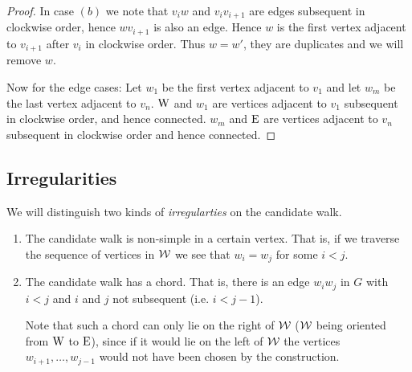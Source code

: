 \begin{proof}
In case $(b)$ we note that $v_i w$ and $v_i v_{i+1}$ are edges subsequent in clockwise order, hence $wv_{i+1}$ is also an edge. Hence $w$ is the first vertex adjacent to $v_{i+1}$ after $v_i$ in clockwise order. Thus $w= w'$, they are duplicates and we will remove $w$.

Now for the edge cases: Let $w_1$ be the first vertex adjacent to $v_1$ and let $w_m$ be the last vertex adjacent to $v_n$. $\mathrm{W}$ and $w_1$ are vertices adjacent to $v_1$ subsequent in clockwise order, and hence connected. $w_m$ and $\mathrm{E}$ are vertices adjacent to $v_n$ subsequent in clockwise order and hence connected. 
\end{proof}


\subsection{Irregularities}

We will distinguish two kinds of \emph{irregularties} on the candidate walk.
\begin{enumerate}
\item The candidate walk is non-simple in a certain vertex. That is, if we traverse the sequence of vertices in $\mathcal{W}$ we see that $w_i = w_j$ for some $i<j$. 
\item The candidate walk has a chord. That is, there is an edge $w_i w_j$ in $G$ with $i<j$ and $i$ and $j$ not subsequent (i.e. $i < j-1$). 

Note that such a chord can only lie on the right of $\mathcal{W}$ ($\mathcal{W}$ being oriented from $\mathrm{W}$ to $\mathrm{E}$), since if it would lie on the left of $\mathcal{W}$ the vertices $w_{i+1},\ldots, w_{j-1}$ would not have been chosen by the construction.  
\end{enumerate}

